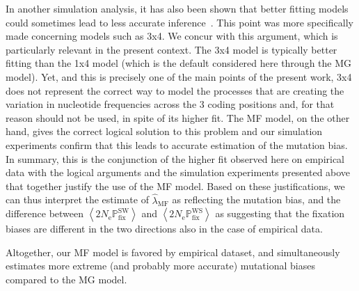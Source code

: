 \documentclass{article}
\newcommand{\Ne}{N_{\text{e}}}
\newcommand{\proba}{\mathbb{P}}
\newcommand{\Pfix}{2 \Ne \proba_{\text{fix}}}
\newcommand{\avgpfixATtoGC}{\left\langle \Pfix^{\text{WS}} \right\rangle }
\newcommand{\avgpfixGCtoAT}{\left\langle \Pfix^{\text{SW}} \right\rangle }
\begin{document}
In another simulation analysis, it has also been shown that better fitting models could sometimes lead to less accurate inference~\citep{Spielman2015}.
This point was more specifically made concerning models such as 3x4.
We concur with this argument, which is particularly relevant in the present context.
The 3x4 model is typically better fitting than the 1x4 model (which is the default considered here through the MG model).
Yet, and this is precisely one of the main points of the present work, 3x4 does not represent the correct way to model the processes that are creating the variation in nucleotide frequencies across the 3 coding positions and, for that reason should not be used, in spite of its higher fit.
The MF model, on the other hand, gives the correct logical solution to this problem and our simulation experiments confirm that this leads to accurate estimation of the mutation bias.
In summary, this is the conjunction of the higher fit observed here on empirical data with the logical arguments and the simulation experiments presented above that together justify the use of the MF model.
Based on these justifications, we can thus interpret the estimate of $\widehat{\lambda}_{\text{{MF}}}$ as reflecting the mutation bias, and the difference between $\avgpfixGCtoAT$ and $\avgpfixATtoGC$ as suggesting that the fixation biases are different in the two directions also in the case of empirical data.

Altogether, our {MF} model is favored by empirical dataset, and simultaneously estimates more extreme (and probably more accurate) mutational biases compared to the {MG} model.
\end{document}

